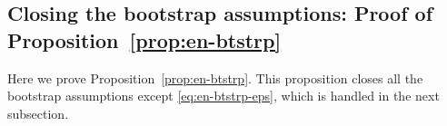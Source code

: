 \documentclass[10pt, reqno]{amsart}
\theoremstyle{definition}
\theoremstyle{remark}
\theoremstyle{conjecture}
\numberwithin{equation}{section}
\newcommand{\rd}{\partial}
\newcommand{\0}{\emptyset}
\newcommand{\lmb}{\lambda}
\newcommand{\bfe}{{\bf e}}
\newcommand{\dur}{\nu}
\newcommand{\dvr}{\lmb}
\newcommand{\e}{\bfe}							%
\newcommand{\phibg}{\overline{\phi}}				%
\newcommand{\phidf}{\widetilde{\phi}}				%
\begin{document}

\subsection{Closing the bootstrap assumptions: Proof of Proposition~\ref{prop:en-btstrp}}
\label{subsec:btstrp-pf}
Here we prove Proposition~\ref{prop:en-btstrp}. This proposition closes all the bootstrap assumptions except \eqref{eq:en-btstrp-eps}, which is handled in the next subsection. 
\end{document}
